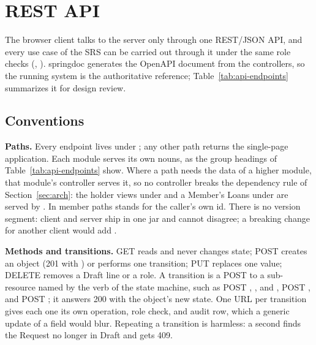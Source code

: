 \section{REST API}\label{sec:api}

The browser client talks to the server only through one REST/JSON API, and every use case of the SRS can be carried out through it under the same role checks (, ). springdoc generates the OpenAPI document from the controllers, so the running system is the authoritative reference; Table~\ref{tab:api-endpoints} summarizes it for design review.

\subsection{Conventions}

\textbf{Paths.} Every endpoint lives under ; any other path returns the single-page application. Each module serves its own nouns, as the group headings of Table~\ref{tab:api-endpoints} show. Where a path needs the data of a higher module, that module's controller serves it, so no controller breaks the dependency rule of Section~\ref{sec:arch}: the holder views under  and a Member's Loans under  are served by . In member paths  stands for the caller's own id. There is no version segment: client and server ship in one jar and cannot disagree; a breaking change for another client would add .

\textbf{Methods and transitions.} GET reads and never changes state; POST creates an object (201 with ) or performs one transition; PUT replaces one value; DELETE removes a Draft line or a role. A transition is a POST to a sub-resource named by the verb of the state machine, such as POST , , and , POST , and POST ; it answers 200 with the object's new state. One URL per transition gives each one its own operation, role check, and audit row, which a generic update of a  field would blur. Repeating a transition is harmless: a second  finds the Request no longer in Draft and gets 409.

